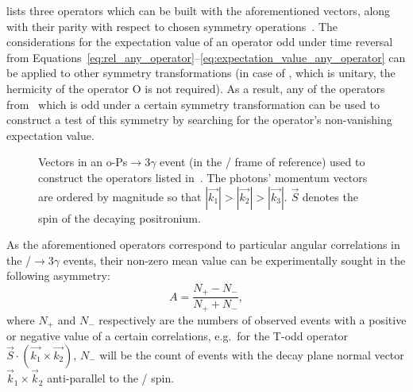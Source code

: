  lists three operators which can be built with the aforementioned vectors, along with their parity with respect to chosen symmetry operations~\cite{moskal_potential}.
%
%
The considerations for the expectation value of an operator odd under time reversal from Equations~\ref{eq:rel_any_operator}--\ref{eq:expectation_value_any_operator} can be applied to other symmetry transformations (in case of \CPs, which is unitary, the hermicity of the operator O is not required). As a result, any of the operators from~ which is odd under a certain symmetry transformation can be used to construct a test of this symmetry by searching for the operator's non-vanishing expectation value.

\begin{figure}[h!]
  \centering
  \caption{Vectors in an o-Ps$\to 3 \gamma$ event (in the \ops/ frame of reference) used to construct the operators listed in~. The photons' momentum vectors are ordered by magnitude so that $|\vec{k_1}| > |\vec{k_2}| > |\vec{k_3}|$. $\vec{S}$ denotes the spin of the decaying positronium.}\label{fig:ops_decay_scheme}
\end{figure}

As the aforementioned operators correspond to particular angular correlations in the \ops/$\to 3\gamma$ events, their non-zero mean value can be experimentally sought in the following asymmetry:
\begin{equation}
  A = \frac{N_+ - N_-}{N_+ + N_-},
\end{equation}
where $N_+$ and $N_-$ respectively are the numbers of observed events with a positive or negative value of a certain correlations, e.g.\ for the T-odd operator ${\vec{S} \cdot (\vec{k_1}\times\vec{k_2})}$, $N_-$ will be the count of events with the decay plane normal vector $\vec{k}_1\times\vec{k}_2$ anti-parallel to the \ops/ spin.

